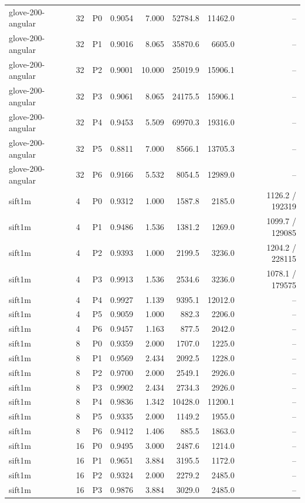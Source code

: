 \begin{tabular}{llrrrrrr}
glove-200-angular & 32 & P0 & 0.9054 & 7.000 & 52784.8 & 11462.0 & -- \\
glove-200-angular & 32 & P1 & 0.9016 & 8.065 & 35870.6 & 6605.0 & -- \\
glove-200-angular & 32 & P2 & 0.9001 & 10.000 & 25019.9 & 15906.1 & -- \\
glove-200-angular & 32 & P3 & 0.9061 & 8.065 & 24175.5 & 15906.1 & -- \\
glove-200-angular & 32 & P4 & 0.9453 & 5.509 & 69970.3 & 19316.0 & -- \\
glove-200-angular & 32 & P5 & 0.8811 & 7.000 & 8566.1 & 13705.3 & -- \\
glove-200-angular & 32 & P6 & 0.9166 & 5.532 & 8054.5 & 12989.0 & -- \\
sift1m & 4 & P0 & 0.9312 & 1.000 & 1587.8 & 2185.0 & 1126.2 / 192319 \\
sift1m & 4 & P1 & 0.9486 & 1.536 & 1381.2 & 1269.0 & 1099.7 / 129085 \\
sift1m & 4 & P2 & 0.9393 & 1.000 & 2199.5 & 3236.0 & 1204.2 / 228115 \\
sift1m & 4 & P3 & 0.9913 & 1.536 & 2534.6 & 3236.0 & 1078.1 / 179575 \\
sift1m & 4 & P4 & 0.9927 & 1.139 & 9395.1 & 12012.0 & -- \\
sift1m & 4 & P5 & 0.9059 & 1.000 & 882.3 & 2206.0 & -- \\
sift1m & 4 & P6 & 0.9457 & 1.163 & 877.5 & 2042.0 & -- \\
sift1m & 8 & P0 & 0.9359 & 2.000 & 1707.0 & 1225.0 & -- \\
sift1m & 8 & P1 & 0.9569 & 2.434 & 2092.5 & 1228.0 & -- \\
sift1m & 8 & P2 & 0.9700 & 2.000 & 2549.1 & 2926.0 & -- \\
sift1m & 8 & P3 & 0.9902 & 2.434 & 2734.3 & 2926.0 & -- \\
sift1m & 8 & P4 & 0.9836 & 1.342 & 10428.0 & 11200.1 & -- \\
sift1m & 8 & P5 & 0.9335 & 2.000 & 1149.2 & 1955.0 & -- \\
sift1m & 8 & P6 & 0.9412 & 1.406 & 885.5 & 1863.0 & -- \\
sift1m & 16 & P0 & 0.9495 & 3.000 & 2487.6 & 1214.0 & -- \\
sift1m & 16 & P1 & 0.9651 & 3.884 & 3195.5 & 1172.0 & -- \\
sift1m & 16 & P2 & 0.9324 & 2.000 & 2279.2 & 2485.0 & -- \\
sift1m & 16 & P3 & 0.9876 & 3.884 & 3029.0 & 2485.0 & -- \\

\end{tabular}
